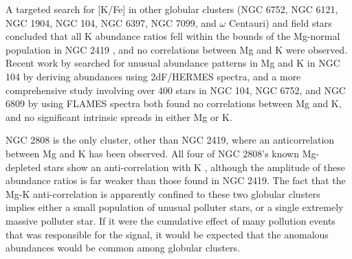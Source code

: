 \documentclass[a4paper,fleqn,usenatbib]{mnras}
\begin{document}
A targeted search for [K/Fe] in other globular clusters (NGC 6752, NGC 6121, NGC 1904, NGC 104, NGC 6397, NGC 7099, and $\omega$ Centauri) and field stars concluded that all K abundance ratios fell within the bounds of the Mg-normal population in NGC 2419 \citep{carretta2013}, and no correlations between Mg and K were observed. Recent work by \cite{cerniauskas201747tuc} searched for unusual abundance patterns in Mg and K in NGC 104 by deriving abundances using 2dF/HERMES spectra, and a more comprehensive study involving over 400 stars in NGC 104, NGC 6752, and NGC 6809 by \cite{mucciarelli2017K} using FLAMES spectra \citep{cerniauskas201747tuc} both found no correlations between Mg and K, and no significant intrinsic spreads in either Mg or K.

NGC 2808 is the only cluster, other than NGC 2419, where an anticorrelation between Mg and K has been observed. All four of NGC 2808's known Mg-depleted stars show an anti-correlation with K \citep{mucciarelli2015}, although the amplitude of these abundance ratios is far weaker than those found in NGC 2419. The fact that the Mg-K anti-correlation is apparently confined to these two globular clusters implies either a small population of unusual polluter stars, or a single extremely massive polluter star. If it were the cumulative effect of many pollution events that was responsible for the signal, it would be expected that the anomalous abundances would be common among globular clusters.





\end{document}
